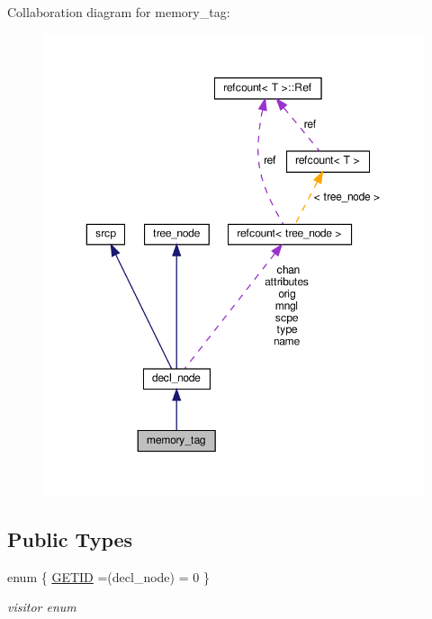 Collaboration diagram for memory\+\_\+tag\+:
\nopagebreak
\begin{figure}[H]
\begin{center}
\leavevmode
\includegraphics[width=350pt]{d1/de4/structmemory__tag__coll__graph}
\end{center}
\end{figure}
\subsection*{Public Types}
\begin{DoxyCompactItemize}
\item 
enum \{ \hyperlink{structmemory__tag_a948cb0427c171d04a713d9a1792eb298a07e7060e1df9b877efed479f066085bc}{G\+E\+T\+ID} =(decl\+\_\+node) = 0
 \}\begin{DoxyCompactList}\small\item\em visitor enum \end{DoxyCompactList}
\end{DoxyCompactItemize}
